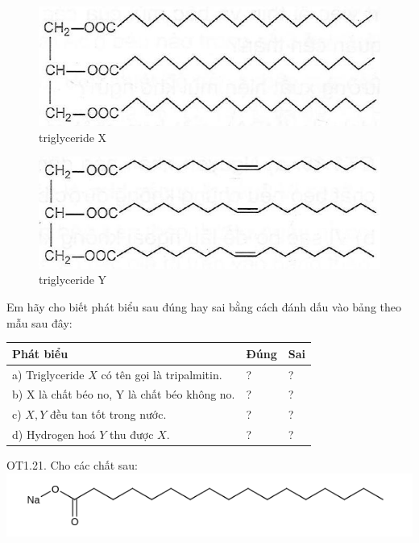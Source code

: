 \documentclass[10pt]{article}
\begin{document}
\begin{figure}[h]
\begin{center}
  \includegraphics[width=\textwidth]{2025_10_23_de6f5713836e4e91b3c8g-018(1)}
\captionsetup{labelformat=empty}
\caption{triglyceride X}
\end{center}
\end{figure}

\begin{figure}[h]
\begin{center}
  \includegraphics[width=\textwidth]{2025_10_23_de6f5713836e4e91b3c8g-018}
\captionsetup{labelformat=empty}
\caption{triglyceride Y}
\end{center}
\end{figure}

Em hãy cho biết phát biểu sau đúng hay sai bằng cách đánh dấu vào bảng theo mẫu sau đây:

\begin{center}
\begin{tabular}{|l|l|l|}
\hline
Phát biểu & Đúng & Sai \\
\hline
a) Triglyceride $X$ có tên gọi là tripalmitin. & ? & ? \\
\hline
b) X là chất béo no, Y là chất béo không no. & ? & ? \\
\hline
c) $X, Y$ đều tan tốt trong nước. & ? & ? \\
\hline
d) Hydrogen hoá $Y$ thu được $X$. & ? & ? \\
\hline
\end{tabular}
\end{center}

OT1.21. Cho các chất sau:\\
\includegraphics{smile-ff11e193a516b262283bdf1ceb23158362d25710}
\end{document}

